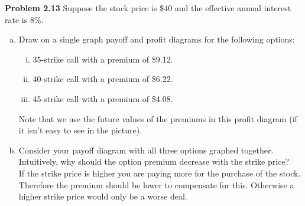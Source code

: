 \documentclass[12pt]{article}
\newcommand{\problem}[1]{\bigskip \noindent \textbf{Problem #1}}
\theoremstyle{plain}
\begin{document}
\problem{2.13} Suppose the stock price is \$40 and the effective annual interest rate is 8\%. 
\begin{enumerate}[(a)]
\item Draw on a single graph payoff and profit diagrams for the following options:
\begin{enumerate}[(i)]
\item 35-strike call with a premium of \$9.12.
\item 40-strike call with a premium of \$6.22.
\item 45-strike call with a premium of \$4.08.
\end{enumerate}

\begin{center}
\end{center}
Note that we use the future values of the premiums in this profit diagram (if it isn't easy to see in the picture).

\item Consider your payoff diagram with all three options graphed together. Intuitively, why should the option premium decrease with the strike price?\\

If the strike price is higher you are paying more for the purchase of the stock. Therefore the premium should be lower to compensate for this. Otherwise a higher strike price would only be a worse deal.

\end{enumerate}
\end{document}

